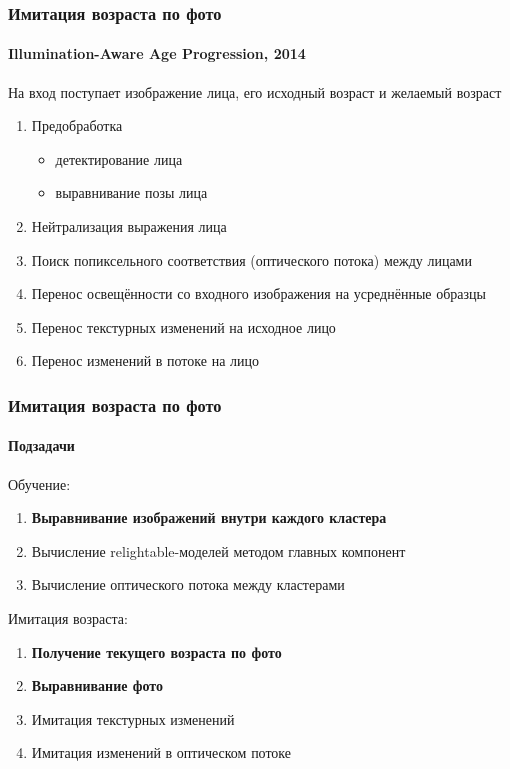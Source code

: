 \documentclass{beamer}
\begin{document}
  \begin{frame}
  	  \frametitle{Имитация возраста по фото}
  	  \framesubtitle{Illumination-Aware Age Progression, 2014}
  	  На вход поступает изображение лица, его исходный возраст и желаемый возраст
  	  \begin{enumerate}
  	  	\item Предобработка
  	  	\begin{itemize}
  	  		\item детектирование лица
  	  		\item выравнивание позы лица
  	  	\end{itemize}
  	  	\item Нейтрализация выражения лица
  	  	\item Поиск попиксельного соответствия (оптического потока) между лицами
  	  	\item Перенос освещённости со входного изображения на усреднённые образцы
  	  	\item Перенос текстурных изменений на исходное лицо
  	  	\item Перенос изменений в потоке на лицо
  	  \end{enumerate}
  \end{frame}
  
  \begin{frame}
	  \frametitle{Имитация возраста по фото}
	  \framesubtitle{Подзадачи}
	  Обучение:
	  \begin{enumerate}
	  	\item \textbf{Выравнивание изображений внутри каждого кластера}
	  	\item Вычисление relightable-моделей методом главных компонент
	  	\item Вычисление оптического потока между кластерами
	  \end{enumerate}	  	  
	  
	  \vspace{1em}	  
	  
	  Имитация возраста:
	  \begin{enumerate}
	  	\item \textbf{Получение текущего возраста по фото}
	  	\item \textbf{Выравнивание фото}
	  	\item Имитация текстурных изменений
	  	\item Имитация изменений в оптическом потоке
	  \end{enumerate}
	  
  \end{frame}
  
\end{document}

